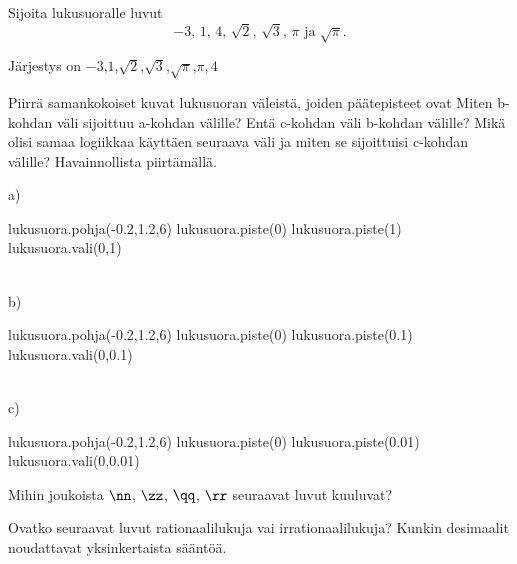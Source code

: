 \begin{tehtavasivu}

\begin{tehtava}%
Sijoita lukusuoralle luvut
\[
\mbox{$-3$, $1$, $4$, $\sqrt{2}$, $\sqrt{3}$, $\pi$ ja $\sqrt{\pi}$.}
\]
\begin{vastaus}
Järjestys on \mbox{$-3$,$1$,$\sqrt{2}$,$\sqrt{3}$,$\sqrt{\pi}$,$\pi,4$}
\end{vastaus}
\end{tehtava}

\begin{tehtava} %
Piirrä samankokoiset kuvat lukusuoran väleistä, joiden päätepisteet ovat 
Miten b-kohdan väli sijoittuu a-kohdan välille? Entä c-kohdan väli b-kohdan välille? Mikä olisi samaa logiikkaa käyttäen seuraava väli ja miten se sijoittuisi c-kohdan välille? Havainnollista piirtämällä.
\begin{vastaus}
a)
\begin{kuva}
	lukusuora.pohja(-0.2,1.2,6)
	lukusuora.piste(0)
	lukusuora.piste(1)
	lukusuora.vali(0,1)
\end{kuva}
\\
b) 
\begin{kuva}
	lukusuora.pohja(-0.2,1.2,6)
	lukusuora.piste(0)
	lukusuora.piste(0.1)
	lukusuora.vali(0,0.1)
\end{kuva}
\\
c) 
\begin{kuva}
	lukusuora.pohja(-0.2,1.2,6)
	lukusuora.piste(0)
	lukusuora.piste(0.01)
	lukusuora.vali(0,0.01)
\end{kuva}
\end{vastaus}
\end{tehtava}


\begin{tehtava}
Mihin joukoista $\nn$, $\zz$, $\qq$, $\rr$ seuraavat luvut kuuluvat?

\begin{vastaus}
\end{vastaus}
\end{tehtava}

\begin{tehtava}
Ovatko seuraavat luvut rationaalilukuja vai irrationaalilukuja? Kunkin desimaalit noudattavat yksinkertaista sääntöä.
\begin{vastaus}
\end{vastaus}
\end{tehtava}


\end{tehtavasivu}
